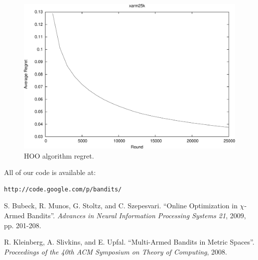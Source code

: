 \documentclass{article}
\begin{document}
\begin{figure}[htb]
  \begin{center}
     \includegraphics[width=\figwidth]{images/xarm25k-crop.pdf}
     \caption{HOO algorithm regret.}
     \label{fig:hoo}
  \end{center}
\end{figure}


All of our code is available at:
\begin{verbatim}
http://code.google.com/p/bandits/
\end{verbatim}



\begin{thebibliography}{99}

S. Bubeck, R. Munos, G. Stoltz, and C. Szepesvari.
``Online Optimization in $\chi$-Armed Bandits''.
\emph{Advances in Neural Information Processing Systems 21}, 2009, pp. 201-208.

R. Kleinberg, A. Slivkins, and E. Upfal.
``Multi-Armed Bandits in Metric Spaces''.
\emph{Proceedings of the 40th ACM Symposium on Theory of Computing}, 2008.

\end{thebibliography}
\end{document}
